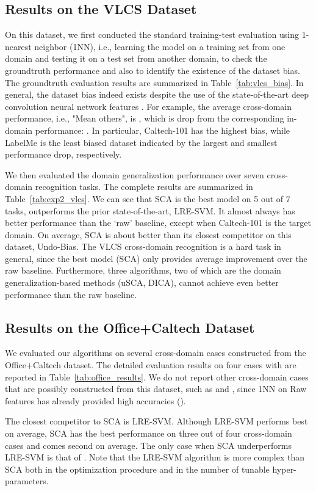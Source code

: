 \documentclass[10pt,journal,compsoc]{IEEEtran}
\begin{document}
\vspace{-1em}
\subsection{Results on the VLCS Dataset}
On this dataset, we first conducted the standard training-test evaluation using 1-nearest neighbor (1NN), i.e., learning the model on a training set from one domain and testing it on a test set from another domain, to check the groundtruth performance and also to identify the existence of the dataset bias.
The groundtruth evaluation results are summarized in Table~\ref{tab:vlcs_bias}.
In general, the dataset bias indeed exists despite the use of the state-of-the-art deep convolution neural network features .
For example, the average cross-domain performance, i.e., "Mean others", is , which is  drop from the corresponding in-domain performance: .
In particular, Caltech-101 has the highest bias, while LabelMe is the least biased dataset indicated by the largest and smallest performance drop, respectively.

We then evaluated the domain generalization performance over seven cross-domain recognition tasks.
The complete results are summarized in Table~\ref{tab:exp2_vlcs}.
We can see that SCA is the best model on 5 out of 7 tasks, outperforms the prior state-of-the-art, LRE-SVM.
It almost always has better performance than the `raw' baseline, except when Caltech-101 is the target domain.
On average, SCA is about  better than its closest competitor on this dataset, Undo-Bias.
The VLCS cross-domain recognition is a hard task in general, since the best model (SCA) only provides  average improvement over the raw baseline.
Furthermore, three algorithms, two of which are the domain generalization-based methods (uSCA, DICA), cannot achieve even better performance than the raw baseline.


\subsection{Results on the Office+Caltech Dataset}
We evaluated our algorithms on several cross-domain cases constructed from the Office+Caltech dataset. 
The detailed evaluation results on four cases with  are reported in Table~\ref{tab:office_results}.
We do not report other cross-domain cases that are possibly constructed from this dataset, such as  and , 
since 1NN on Raw features has already provided high accuracies ().


The closest competitor to SCA is LRE-SVM.
Although LRE-SVM performs best on average, SCA has the best performance on three out of four cross-domain cases and comes second on average.
The only case when SCA underperforms LRE-SVM is that of .
Note that the LRE-SVM algorithm is more complex than SCA both in the optimization procedure and in the number of tunable hyper-parameters.
\end{document}

